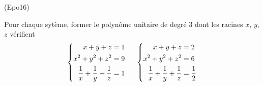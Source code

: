 \begin{tiny}(Epo16)\end{tiny} Pour chaque sytème, former le polynôme unitaire de degré $3$ dont les racines $x$, $y$, $z$ vérifient
\begin{displaymath}
 \left\lbrace 
\begin{aligned}
 x+y+z &= 1\\ 
 x^2+y^2+z^2 &= 9\\
\frac{1}{x}+\frac{1}{y}+\frac{1}{z} &=1
\end{aligned}
\right.  \hspace{0.5cm}
 \left\lbrace
\begin{aligned}
 x+y+z &= 2\\ 
 x^2+y^2+z^2 &= 6\\
\frac{1}{x}+\frac{1}{y}+\frac{1}{z} &= \frac{1}{2}
\end{aligned}
\right. 
\end{displaymath}
